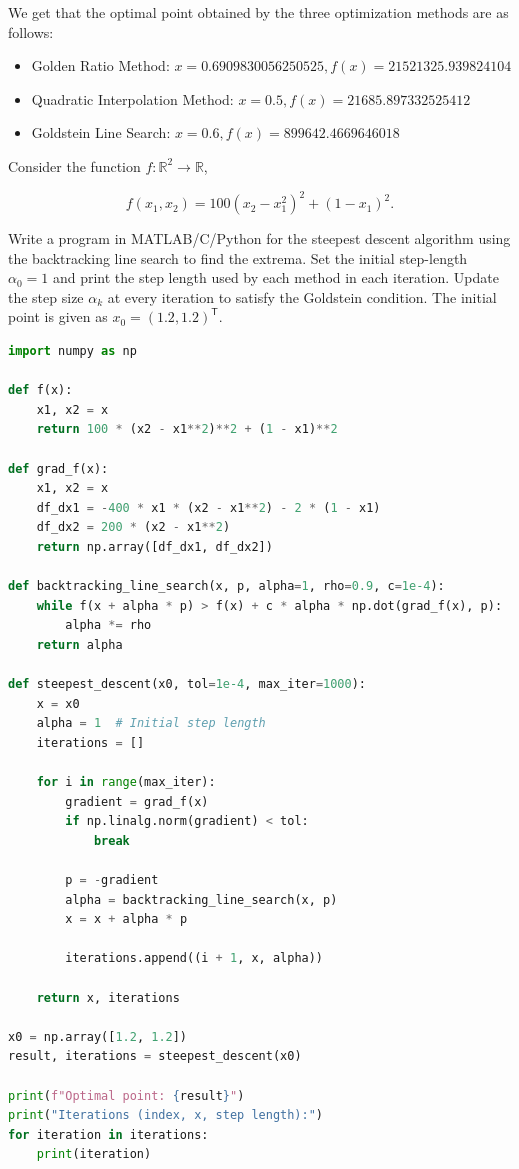 \documentclass{article}
\begin{document}
We get that the optimal point obtained by the three optimization methods are as follows:

\begin{itemize}
    \item Golden Ratio Method: $x = 0.6909830056250525 , f(x) = 21521325.939824104$
    \item Quadratic Interpolation Method: $x = 0.5 , f(x) = 21685.897332525412$
    \item Goldstein Line Search: $x = 0.6 , f(x) = 899642.4669646018$
\end{itemize}


\begin{question*}[8]
Consider the function \( f: \mathbb{R}^2 \to \mathbb{R} \),

\[
f(x_1, x_2) = 100(x_2 - x_1^2)^2 + (1 - x_1)^2.
\]

Write a program in MATLAB/C/Python for the steepest descent algorithm using the backtracking line search to find the extrema. Set the initial step-length \( \alpha_0 = 1 \) and print the step length used by each method in each iteration. Update the step size \( \alpha_k \) at every iteration to satisfy the Goldstein condition. The initial point is given as \( x_0 = (1.2, 1.2)^\mathsf{T} \).
\end{question*}

\begin{lstlisting}[language=Python]
import numpy as np

def f(x):
    x1, x2 = x
    return 100 * (x2 - x1**2)**2 + (1 - x1)**2

def grad_f(x):
    x1, x2 = x
    df_dx1 = -400 * x1 * (x2 - x1**2) - 2 * (1 - x1)
    df_dx2 = 200 * (x2 - x1**2)
    return np.array([df_dx1, df_dx2])

def backtracking_line_search(x, p, alpha=1, rho=0.9, c=1e-4):
    while f(x + alpha * p) > f(x) + c * alpha * np.dot(grad_f(x), p):
        alpha *= rho
    return alpha

def steepest_descent(x0, tol=1e-4, max_iter=1000):
    x = x0
    alpha = 1  # Initial step length
    iterations = []

    for i in range(max_iter):
        gradient = grad_f(x)
        if np.linalg.norm(gradient) < tol:
            break

        p = -gradient
        alpha = backtracking_line_search(x, p) 
        x = x + alpha * p 

        iterations.append((i + 1, x, alpha)) 

    return x, iterations

x0 = np.array([1.2, 1.2])
result, iterations = steepest_descent(x0)

print(f"Optimal point: {result}")
print("Iterations (index, x, step length):")
for iteration in iterations:
    print(iteration)
\end{lstlisting}
\end{document}
